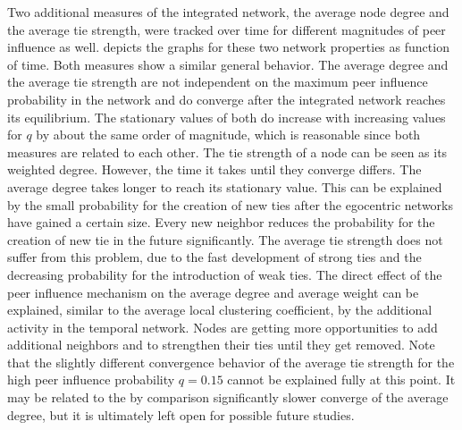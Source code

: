 Two additional measures of the integrated network, the average node degree and the average tie strength, were tracked over time for different magnitudes of peer influence as well.
 depicts the graphs for these two network properties as function of time.
Both measures show a similar general behavior.
The average degree and the average tie strength are not independent on the maximum peer influence probability in the network and do converge after the integrated network reaches its equilibrium.
The stationary values of both do increase with increasing values for \( q \) by about the same order of magnitude, which is reasonable since both measures are related to each other.
The tie strength of a node can be seen as its weighted degree.
However, the time it takes until they converge differs.
The average degree takes longer to reach its stationary value.
This can be explained by the small probability for the creation of new ties after the egocentric networks have gained a certain size.
Every new neighbor reduces the probability for the creation of new tie in the future significantly.
The average tie strength does not suffer from this problem, due to the fast development of strong ties and the decreasing probability for the introduction of weak ties. 
The direct effect of the peer influence mechanism on the average degree and average weight can be explained, similar to the average local clustering coefficient, by the additional activity in the temporal network.
Nodes are getting more opportunities to add additional neighbors and to strengthen their ties until they get removed.
Note that the slightly different convergence behavior of the average tie strength for the high peer influence probability \( q = 0.15 \) cannot be explained fully at this point. It may be related to the by comparison significantly slower converge of the average degree, but it is ultimately left open for possible future studies. 


